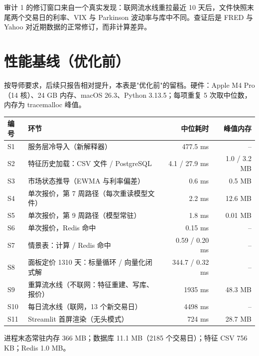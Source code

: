 \documentclass[11pt]{ctexart}
\begin{document}
审计 1 的修订窗口来自一个真实发现：联网流水线重拉最近 10 天后，文件快照末尾两个交易日的利率、VIX 与 Parkinson 波动率与库中不同。查证后是 FRED 与 Yahoo 对近期数据的正常修订，而非计算差异。

\section{性能基线（优化前）}

按导师要求，后续只报告相对提升，本表是"优化前"的留档。硬件：Apple M4 Pro（14 核）、24 GB 内存、macOS 26.3、Python 3.13.5；每项重复 5 次取中位数，内存为 tracemalloc 峰值。

\begin{center}\small
\begin{tabular}{p{0.9cm}p{7.2cm}rr}
\toprule
编号 & 环节 & 中位耗时 & 峰值内存 \\
\midrule
S1 & 服务层冷导入（新解释器） & 477.5 ms & -- \\
S2 & 特征历史加载：CSV 文件 / PostgreSQL & 4.1 / 27.9 ms & 1.0 / 3.2 MB \\
S3 & 市场状态推导（EWMA 与利率偏差） & 0.6 ms & 0.5 MB \\
S4 & 单次报价，第 7 周路径（每次重读模型文件） & 2.2 ms & 12.6 MB \\
S5 & 单次报价，第 9 周路径（模型常驻） & 1.8 ms & 0.01 MB \\
S6 & 单次报价，Redis 命中 & 0.15 ms & -- \\
S7 & 情景表：计算 / Redis 命中 & 0.59 / 0.20 ms & -- \\
S8 & 面板定价 1310 天：标量循环 / 向量化闭式解 & 344.7 / 0.32 ms & -- \\
S9 & 重算流水线（不联网：特征重建、写库、报价） & 1935 ms & 48.3 MB \\
S10 & 每日流水线（联网，13 个新交易日） & 4498 ms & -- \\
S11 & Streamlit 首屏渲染（无头模式） & 724 ms & 28.7 MB \\
\bottomrule
\end{tabular}
\end{center}

进程末态常驻内存 366 MB；数据库 11.1 MB（2185 个交易日）；特征 CSV 756 KB；Redis 1.0 MB。
\end{document}
